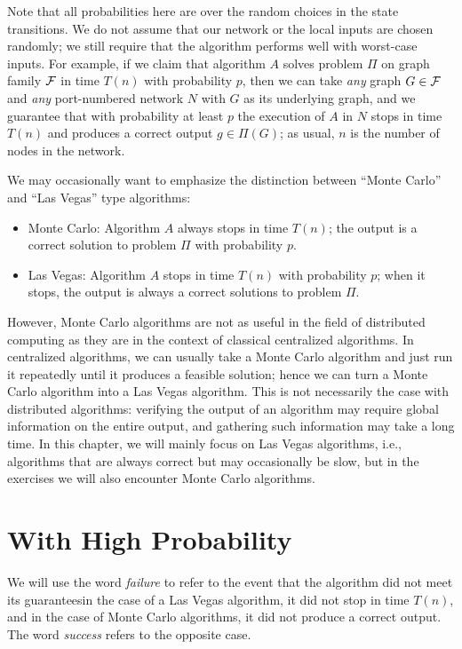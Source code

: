 Note that all probabilities here are over the random choices in the state transitions. We do not assume that our network or the local inputs are chosen randomly; we still require that the algorithm performs well with worst-case inputs. For example, if we claim that algorithm $A$ solves problem $\Pi$ on graph family $\mathcal{F}$ in time $T(n)$ with probability $p$, then we can take \emph{any} graph $G \in \mathcal{F}$ and \emph{any} port-numbered network $N$ with $G$ as its underlying graph, and we guarantee that with probability at least $p$ the execution of $A$ in $N$ stops in time $T(n)$ and produces a correct output $g \in \Pi(G)$; as usual, $n$ is the number of nodes in the network.

We may occasionally want to emphasize the distinction between ``Monte Carlo'' and ``Las Vegas'' type algorithms:
\begin{itemize}
    \item Monte Carlo: Algorithm $A$ always stops in time $T(n)$; the output is a correct solution to problem $\Pi$ with probability $p$.
    \item Las Vegas: Algorithm $A$ stops in time $T(n)$ with probability $p$; when it stops, the output is always a correct solutions to problem $\Pi$.
\end{itemize}
However, Monte Carlo algorithms are not as useful in the field of distributed computing as they are in the context of classical centralized algorithms. In centralized algorithms, we can usually take a Monte Carlo algorithm and just run it repeatedly until it produces a feasible solution; hence we can turn a Monte Carlo algorithm into a Las Vegas algorithm. This is not necessarily the case with distributed algorithms: verifying the output of an algorithm may require global information on the entire output, and gathering such information may take a long time. In this chapter, we will mainly focus on Las Vegas algorithms, i.e., algorithms that are always correct but may occasionally be slow, but in the exercises we will also encounter Monte Carlo algorithms.


\section{With High Probability}

We will use the word \emph{failure} to refer to the event that the algorithm did not meet its guarantees\mydash in the case of a Las Vegas algorithm, it did not stop in time $T(n)$, and in the case of Monte Carlo algorithms, it did not produce a correct output. The word \emph{success} refers to the opposite case.

